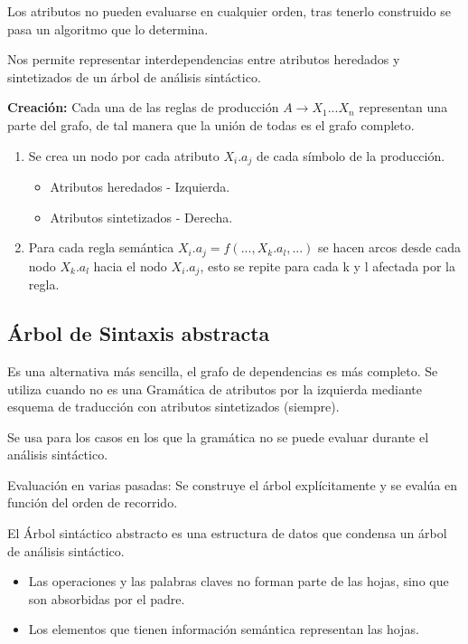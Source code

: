 \documentclass[12pt, twoside, openright]{report} %
\begin{document}
Los atributos no pueden evaluarse en cualquier orden, tras tenerlo construido se pasa un algoritmo que lo determina.

Nos permite representar interdependencias entre atributos heredados y sintetizados de un árbol de análisis sintáctico.

\begin{figure}[H]
  {\def\svgwidth{.9\textwidth}
  }
\end{figure}

\textbf{Creación:} Cada una de las reglas de producción $A \rightarrow X_1 ... X_n$ representan una parte del grafo, de tal manera que la unión de todas es el grafo completo.
\begin{enumerate}
  \item Se crea un nodo por cada atributo $X_i.a_j$ de cada símbolo de la producción.
  \begin{itemize}
    \item Atributos heredados - Izquierda.
    \item Atributos sintetizados - Derecha.
  \end{itemize}
  \item Para cada regla semántica $X_i.a_j = f(...,X_k.a_l, ...)$ se hacen arcos desde cada nodo $X_k.a_l$ hacia el nodo $X_i.a_j$, esto se repite para cada k y l afectada por la regla.
\end{enumerate}
\pagebreak
\subsection{Árbol de Sintaxis abstracta}
Es una alternativa más sencilla, el grafo de dependencias es más completo. Se utiliza cuando no es una Gramática de atributos por la izquierda mediante esquema de traducción con atributos sintetizados (siempre).

Se usa para los casos en los que la gramática no se puede evaluar durante el análisis sintáctico.

Evaluación en varias pasadas: Se construye el árbol explícitamente y se evalúa en función del orden de recorrido.

\begin{figure}[H]
	{\def\svgwidth{.8\textwidth}
  }
\end{figure}

El Árbol sintáctico abstracto es una estructura de datos que condensa un árbol de análisis sintáctico. 
\begin{itemize}
  \item Las operaciones y las palabras claves no forman parte de las hojas, sino que son absorbidas por el padre. 
  \item Los elementos que tienen información semántica representan las hojas.
\end{itemize}
\end{document}

